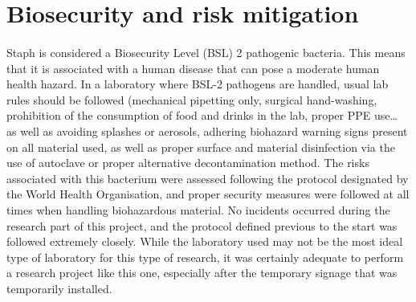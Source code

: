 \section{Biosecurity and risk mitigation}
\paragraph{}Staph is considered a Biosecurity Level (BSL) 2 pathogenic bacteria\cite{cheungPathogenicityVirulenceStaphylococcus2021}. This means that it is associated with a human disease that can pose a moderate human health hazard. In a laboratory where BSL-2 pathogens are handled, usual lab rules should be followed (mechanical pipetting only, surgical hand-washing, prohibition of the consumption of food and drinks in the lab, proper PPE use… as well as avoiding splashes or aerosols, adhering biohazard warning signs present on all material used, as well as proper surface and material disinfection via the use of autoclave or proper alternative decontamination method.\newline
The risks associated with this bacterium were assessed following the protocol designated by the World Health Organisation, and proper security measures were followed at all times when handling biohazardous material. No incidents occurred during the research part of this project, and the protocol defined previous to the start was followed extremely closely. While the laboratory used may not be the most ideal type of laboratory for this type of research, it was certainly adequate to perform a research project like this one, especially after the temporary signage that was temporarily installed\cite{worldhealthorganizationLaboratoryBiosafetyManual2020}.\newpage
